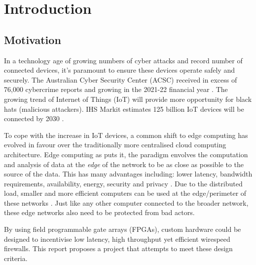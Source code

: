 \chapter[Introduction]{Introduction}
\label{Chap:Intro}



\section{Motivation }


In a technology age of growing numbers of cyber attacks and record number of connected devices, it's 
paramount to ensure these devices operate safely and securely. The Australian Cyber Security Center (ACSC) received in 
excess of 76,000 cybercrime reports and growing in the 2021-22 financial year \cite{acsc_2022}. The growing trend of Internet of Things (IoT) will provide 
more opportunity for black hats (malicious attackers). IHS Markit estimates 125 billion IoT devices will be connected by 2030 \cite{IHS_iot}. 

To cope with the increase in IoT devices, a common shift to edge computing has evolved in favour over the traditionally more centralised cloud computing 
architecture. Edge computing as \cite{EdgeComputing} puts it, the paradigm envolves the computation and analysis of data 
at the \textit{edge} of the network to be as close as possible to the source of the data. This has many advantages including: lower latency, bandwidth requirements,
availability, energy, security and privacy \cite{EdgeComputing}. Due to the distributed load, smaller and more efficient computers can be used 
at the edge/perimeter of these networks \cite{EdgeComputingPerspectives}. Just like any other computer connected to the broader network, these 
edge networks also need to be protected from bad actors.


By using field programmable gate arrays (FPGAs), custom hardware could be designed to incentivise low latency, high throughput yet efficient wirespeed firewalls. 
This report proposes a project that attempts to meet these design criteria. 




